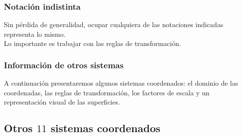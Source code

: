 \documentclass[12pt]{beamer}
\begin{document}
\begin{frame}
\frametitle{Notación indistinta}
Sin pérdida de generalidad, ocupar cualquiera de las notaciones indicadas representa lo mismo.
\\
\bigskip
\pause
Lo importante es trabajar con las reglas de transformación.
\end{frame}
\begin{frame}
\frametitle{Información de otros sistemas}
A continuación presentaremos algunos sistemas coordenados: el dominio de las coordenadas, las reglas de transformación, los factores de escala y un representación visual de las superficies.
\end{frame}

\subsection{Otros \texorpdfstring{$11$}{11} sistemas coordenados}
\end{document}
